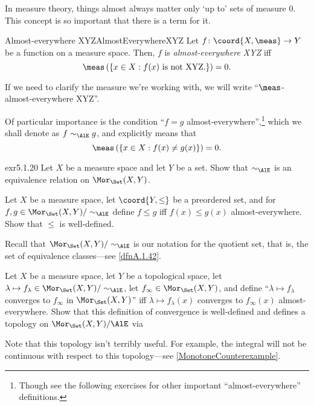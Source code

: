 In measure theory, things almost always matter only `up to' sets of measure $0$.  This concept is so important that there is a term for it.
\begin{mdf}{Almost-everywhere XYZ\hfill}{AlmostEverywhereXYZ}
Let $f\colon \coord{X,\meas}\rightarrow Y$ be a function on a measure space.  Then, $f$ is \emph{almost-everywhere XYZ} iff
\begin{equation}
\meas \left( \left\{ x\in X:f(x)\text{ is not XYZ.}\right\} \right) =0.
\end{equation}
\begin{rmk}
If we need to clarify the measure we're working with, we will write ``$\meas$-almost-everywhere XYZ''.
\end{rmk}
\begin{rmk}
Of particular importance is the condition ``$f=g$ almost-everywhere'',\footnote{Though see the following exercises for other important ``almost-everywhere'' definitions.} which we shall denote as $f\sim _{\AlE}g$, and explicitly means that
\begin{equation}
\meas \left( \left\{ x\in X:f(x)\neq g(x)\right\} \right) =0.
\end{equation}
\end{rmk}
\end{mdf}
\begin{exr}{}{exr5.1.20}
Let $X$ be a measure space and let $Y$ be a set.  Show that $\sim _{\AlE}$ is an equivalence relation on $\Mor _{\Set}(X,Y)$.
\end{exr}
\begin{exr}{}{}
Let $X$ be a measure space, let $\coord{Y,\leq}$ be a preordered set, and for $f,g\in \Mor _{\Set}(X,Y)/\sim _{\AlE}$ define $f\leq g$ iff $f(x)\leq g(x)$ almost-everywhere.  Show that $\leq$ is well-defined.
\begin{rmk}
Recall that $\Mor _{\Set}(X,Y)/\sim _{\AlE}$ is our notation for the quotient set, that is, the set of equivalence classes---see \cref{dfnA.1.42}.
\end{rmk}
\end{exr}
\begin{exr}{}{}
Let $X$ be a measure space, let $Y$ be a topological space, let $\lambda \mapsto f_{\lambda}\in \Mor _{\Set}(X,Y)/\sim _{\AlE}$, let $f_{\infty}\in \Mor _{\Set}(X,Y)$, and define ``$\lambda \mapsto f_{\lambda}$ converges to $f_{\infty}$ in $\Mor _{\Set}(X,Y)$'' iff $\lambda \mapsto f_{\lambda}(x)$ converges to $f_{\infty}(x)$ almost-everywhere.  Show that this definition of convergence is well-defined and defines a topology on $\Mor _{\Set}(X,Y)/\AlE$ via 
\begin{rmk}
Note that this topology isn't terribly useful.  For example, the integral will not be continuous with respect to this topology---see \cref{MonotoneCounterexample}.
\end{rmk}
\end{exr}
